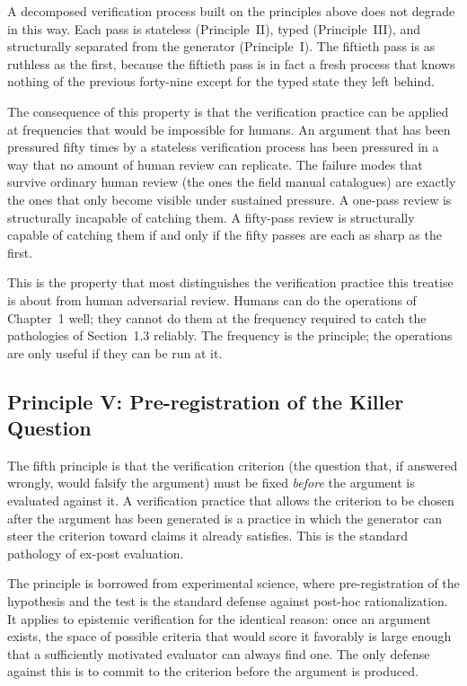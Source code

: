 \documentclass[11pt]{article}
\begin{document}
A decomposed verification process built on the principles above does not degrade in this way. Each pass is stateless (Principle~II), typed (Principle~III), and structurally separated from the generator (Principle~I). The fiftieth pass is as ruthless as the first, because the fiftieth pass is in fact a fresh process that knows nothing of the previous forty-nine except for the typed state they left behind.

The consequence of this property is that the verification practice can be applied at frequencies that would be impossible for humans. An argument that has been pressured fifty times by a stateless verification process has been pressured in a way that no amount of human review can replicate. The failure modes that survive ordinary human review (the ones the field manual catalogues) are exactly the ones that only become visible under sustained pressure. A one-pass review is structurally incapable of catching them. A fifty-pass review is structurally capable of catching them if and only if the fifty passes are each as sharp as the first.

This is the property that most distinguishes the verification practice this treatise is about from human adversarial review. Humans can do the operations of Chapter~1 well; they cannot do them at the frequency required to catch the pathologies of Section~1.3 reliably. The frequency is the principle; the operations are only useful if they can be run at it.

\subsection{Principle V: Pre-registration of the Killer Question}

The fifth principle is that the verification criterion (the question that, if answered wrongly, would falsify the argument) must be fixed \emph{before} the argument is evaluated against it. A verification practice that allows the criterion to be chosen after the argument has been generated is a practice in which the generator can steer the criterion toward claims it already satisfies. This is the standard pathology of ex-post evaluation.

The principle is borrowed from experimental science, where pre-registration of the hypothesis and the test is the standard defense against post-hoc rationalization. It applies to epistemic verification for the identical reason: once an argument exists, the space of possible criteria that would score it favorably is large enough that a sufficiently motivated evaluator can always find one. The only defense against this is to commit to the criterion before the argument is produced.
\end{document}

